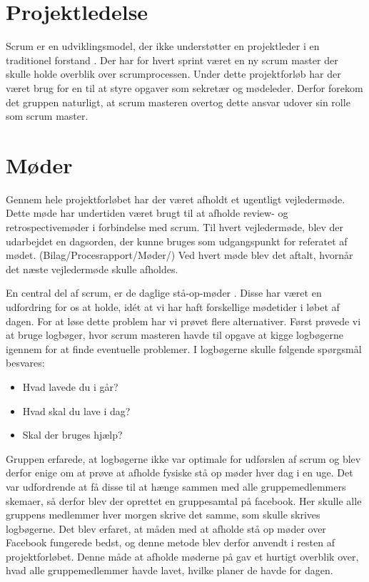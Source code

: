 \section{Projektledelse}
Scrum er en udviklingsmodel, der ikke understøtter en projektleder i en traditionel forstand \cite{scrumGuides}. Der har for hvert sprint været en ny scrum master der skulle holde overblik over scrumprocessen. Under dette projektforløb har der været brug for en til at styre opgaver som sekretær og mødeleder. Derfor forekom det gruppen naturligt, at scrum masteren overtog dette ansvar udover sin rolle som scrum master.

\section{Møder}
Gennem hele projektforløbet har der været afholdt et ugentligt vejledermøde. Dette møde har undertiden været brugt til at afholde review- og retrospectivemøder i forbindelse med scrum. Til hvert vejledermøde, blev der udarbejdet en dagsorden, der kunne bruges som udgangspunkt for referatet af mødet. (Bilag/Procesrapport/Møder/) Ved hvert møde blev det aftalt, hvornår det næste vejledermøde skulle afholdes.\newline

\noindent En central del af scrum, er de daglige stå-op-møder \cite{scrumGuides}. Disse har været en udfordring for os at holde, idét at vi har haft forskellige mødetider i løbet af dagen. For at løse dette problem har vi prøvet flere alternativer. Først prøvede vi at bruge logbøger, hvor scrum masteren havde til opgave at kigge logbøgerne igennem for at finde eventuelle problemer. I logbøgerne skulle følgende spørgsmål besvares:

\begin{itemize}
	\item Hvad lavede du i går?
	\item Hvad skal du lave i dag?
	\item Skal der bruges hjælp?
\end{itemize} 

Gruppen erfarede, at logbøgerne ikke var optimale for udførslen af scrum og blev derfor enige om at prøve at afholde fysiske stå op møder hver dag i en uge. Det var udfordrende at få disse til at hænge sammen med alle gruppemedlemmers skemaer, så derfor blev der oprettet en gruppesamtal på facebook. Her skulle alle gruppens medlemmer hver morgen skrive det samme, som skulle skrives logbøgerne. Det blev erfaret, at måden med at afholde stå op møder over Facebook fungerede bedst, og denne metode blev derfor anvendt i resten af projektforløbet. Denne måde at afholde møderne på gav et hurtigt overblik over, hvad alle gruppemedlemmer havde lavet, hvilke planer de havde for dagen. 

